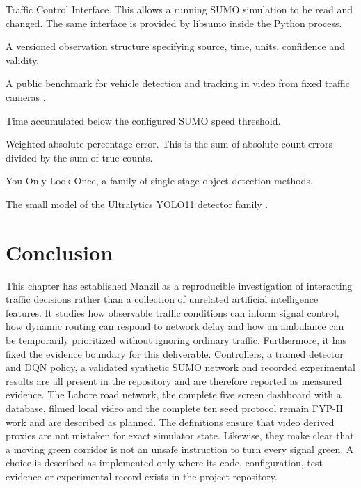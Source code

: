 \begin{description}[font=\normalfont,leftmargin=0pt,itemindent=0.45em,labelsep=0.45em,itemsep=0pt,parsep=0pt,topsep=0.25\baselineskip]
\item[TraCI:] Traffic Control Interface. This allows a running SUMO simulation to be read and changed. The same interface is provided by libsumo inside the Python process.
\item[Traffic state contract:] A versioned observation structure specifying source, time, units, confidence and validity.
\item[UA-DETRAC:] A public benchmark for vehicle detection and tracking in video from fixed traffic cameras \cite{wen2020uadetrac}.
\item[Waiting time:] Time accumulated below the configured SUMO speed threshold.
\item[WAPE:] Weighted absolute percentage error. This is the sum of absolute count errors divided by the sum of true counts.
\item[YOLO:] You Only Look Once, a family of single stage object detection methods.
\item[YOLO11s:] The small model of the Ultralytics YOLO11 detector family \cite{ultralytics2024yolo11}.
\end{description}

\section{Conclusion}

This chapter has established Manzil as a reproducible investigation of interacting traffic decisions rather than a collection of unrelated artificial intelligence features. It studies how observable traffic conditions can inform signal control, how dynamic routing can respond to network delay and how an ambulance can be temporarily prioritized without ignoring ordinary traffic. Furthermore, it has fixed the evidence boundary for this deliverable. Controllers, a trained detector and DQN policy, a validated synthetic SUMO network and recorded experimental results are all present in the repository and are therefore reported as measured evidence. The Lahore road network, the complete five screen dashboard with a database, filmed local video and the complete ten seed protocol remain FYP-II work and are described as planned. The definitions ensure that video derived proxies are not mistaken for exact simulator state. Likewise, they make clear that a moving green corridor is not an unsafe instruction to turn every signal green. A choice is described as implemented only where its code, configuration, test evidence or experimental record exists in the project repository.

